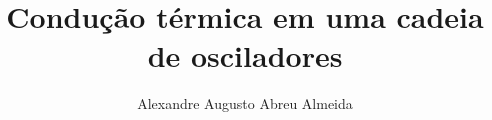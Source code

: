 \documentclass[master,american]{ThesisPUC}
\author{Alexandre Augusto Abreu Almeida}
\title{Condução térmica em uma cadeia de osciladores}
\begin{document}
  
  
  
  
  
  
  \arial
  \nocite{*}
  
  \normalfont
  
\end{document}
